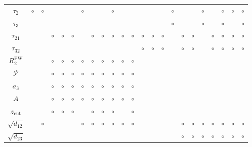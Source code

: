 \begin{table}[tp]
\begin{tabular}{ c| c c c c c c c c c |c c|| c c c c c c c c c |c c| }
\multicolumn{1}{|c||}{$\tau_2$}       & $\circ$ & $\circ$ &     &     &     & $\circ$ &     &     & $\circ$ &     &     &     &     &     & $\circ$ &     &     & $\circ$ &     & $\circ$ & $\circ$ & $\circ$   \\
\multicolumn{1}{|c||}{$\tau_3$}       &     &     &     &     &     &     &     &     &     &     &     &     &     &     & $\circ$ &     &     & $\circ$ &     & $\circ$ &     & $\circ$   \\
\multicolumn{1}{|c||}{$\tau_{21}$}    &     &     & $\circ$ & $\circ$ & $\circ$ &     & $\circ$ & $\circ$ & $\circ$ & $\circ$ & $\circ$ & $\circ$ & $\circ$ & $\circ$ &     & $\circ$ & $\circ$ &     & $\circ$ & $\circ$ & $\circ$ & $\circ$   \\
\multicolumn{1}{|c||}{$\tau_{32}$}    &     &     &     &     &     &     &     &     &     &     &     & $\circ$ & $\circ$ & $\circ$ &     & $\circ$ & $\circ$ &     & $\circ$ & $\circ$ & $\circ$ & $\circ$   \\
\multicolumn{1}{|c||}{$R_2^{\mathrm{FW}}$} &     &     & $\circ$ & $\circ$ & $\circ$ & $\circ$ & $\circ$ & $\circ$ & $\circ$ & $\circ$ & $\circ$ &     &     &     &     &     &     &     &     &     &     & \\
\multicolumn{1}{|c||}{$\mathcal{P}$}   &     &     & $\circ$ & $\circ$ & $\circ$ & $\circ$ & $\circ$ & $\circ$ & $\circ$ & $\circ$ & $\circ$ &     &     &     &     &     &     &     &     &     &     & \\
\multicolumn{1}{|c||}{$a_3$}   &     &     & $\circ$ & $\circ$ & $\circ$ & $\circ$ & $\circ$ & $\circ$ & $\circ$ & $\circ$ & $\circ$ &     &     &     &     &     &     &     &     &     &     & \\
\multicolumn{1}{|c||}{$A$}   &     &     & $\circ$ & $\circ$ & $\circ$ & $\circ$ & $\circ$ & $\circ$ & $\circ$ & $\circ$ & $\circ$ &     &     &     &     &     &     &     &     &     &     & \\
\multicolumn{1}{|c||}{$z_\mathrm{cut}$}         &     &     & $\circ$ & $\circ$ & $\circ$ &     & $\circ$ & $\circ$ & $\circ$ &     & $\circ$ &     &     &     &     &     &     &     &     &     &     & \\
\multicolumn{1}{|c||}{$\sqrt{d_{12}}$}      &     & $\circ$ &     &     &     & $\circ$ & $\circ$ & $\circ$ & $\circ$ & $\circ$ & $\circ$ &     &     &     &     & $\circ$ & $\circ$ & $\circ$ & $\circ$ & $\circ$ & $\circ$ & $\circ$   \\
\multicolumn{1}{|c||}{$\sqrt{d_{23}}$}      &     &     &     &     &     &     &     &     &     &     &     &     &     &     &     & $\circ$ & $\circ$ & $\circ$ & $\circ$ & $\circ$ & $\circ$ & $\circ$   \\

\end{tabular}
\end{table}
